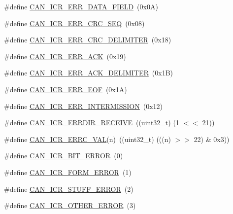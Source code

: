 \begin{DoxyCompactItemize}
\item 
\#define \hyperlink{group__CAN__17XX__40XX_ga6e4f045223b2f154cb449a95b5c19d2d}{C\-A\-N\-\_\-\-I\-C\-R\-\_\-\-E\-R\-R\-\_\-\-D\-A\-T\-A\-\_\-\-F\-I\-E\-L\-D}~(0x0\-A)
\item 
\#define \hyperlink{group__CAN__17XX__40XX_ga796e6b5aaf64f404e0d6960ce0dc2945}{C\-A\-N\-\_\-\-I\-C\-R\-\_\-\-E\-R\-R\-\_\-\-C\-R\-C\-\_\-\-S\-E\-Q}~(0x08)
\item 
\#define \hyperlink{group__CAN__17XX__40XX_gaa6defe8882ac6fb2e0048afa6bec7205}{C\-A\-N\-\_\-\-I\-C\-R\-\_\-\-E\-R\-R\-\_\-\-C\-R\-C\-\_\-\-D\-E\-L\-I\-M\-I\-T\-E\-R}~(0x18)
\item 
\#define \hyperlink{group__CAN__17XX__40XX_gadbec8cb293c961db6ba27da0fdd6a30c}{C\-A\-N\-\_\-\-I\-C\-R\-\_\-\-E\-R\-R\-\_\-\-A\-C\-K}~(0x19)
\item 
\#define \hyperlink{group__CAN__17XX__40XX_gaa073aa014b3274b624a476395bb3865a}{C\-A\-N\-\_\-\-I\-C\-R\-\_\-\-E\-R\-R\-\_\-\-A\-C\-K\-\_\-\-D\-E\-L\-I\-M\-I\-T\-E\-R}~(0x1\-B)
\item 
\#define \hyperlink{group__CAN__17XX__40XX_ga800e0bc49882ff1cfa4043087a8ff76c}{C\-A\-N\-\_\-\-I\-C\-R\-\_\-\-E\-R\-R\-\_\-\-E\-O\-F}~(0x1\-A)
\item 
\#define \hyperlink{group__CAN__17XX__40XX_gafd3bd849f9878685f2493810f74828ef}{C\-A\-N\-\_\-\-I\-C\-R\-\_\-\-E\-R\-R\-\_\-\-I\-N\-T\-E\-R\-M\-I\-S\-S\-I\-O\-N}~(0x12)
\item 
\#define \hyperlink{group__CAN__17XX__40XX_ga8c2502b4b9de05c032f1f9e30dbce585}{C\-A\-N\-\_\-\-I\-C\-R\-\_\-\-E\-R\-R\-D\-I\-R\-\_\-\-R\-E\-C\-E\-I\-V\-E}~((uint32\-\_\-t) (1 $<$$<$ 21))
\item 
\#define \hyperlink{group__CAN__17XX__40XX_gaf1e12de60b5088129364cf16e293e62d}{C\-A\-N\-\_\-\-I\-C\-R\-\_\-\-E\-R\-R\-C\-\_\-\-V\-A\-L}(n)~((uint32\-\_\-t) (((n) $>$$>$ 22) \& 0x3))
\item 
\#define \hyperlink{group__CAN__17XX__40XX_gae0d9f76da8551af305bc21299ae4f900}{C\-A\-N\-\_\-\-I\-C\-R\-\_\-\-B\-I\-T\-\_\-\-E\-R\-R\-O\-R}~(0)
\item 
\#define \hyperlink{group__CAN__17XX__40XX_ga30d289c9dfa864c2b80b9e558d152d45}{C\-A\-N\-\_\-\-I\-C\-R\-\_\-\-F\-O\-R\-M\-\_\-\-E\-R\-R\-O\-R}~(1)
\item 
\#define \hyperlink{group__CAN__17XX__40XX_gaf6250596af79d4af0a3f5e1ff7b46e74}{C\-A\-N\-\_\-\-I\-C\-R\-\_\-\-S\-T\-U\-F\-F\-\_\-\-E\-R\-R\-O\-R}~(2)
\item 
\#define \hyperlink{group__CAN__17XX__40XX_ga99676739f4c76530af531657c2cdf4c2}{C\-A\-N\-\_\-\-I\-C\-R\-\_\-\-O\-T\-H\-E\-R\-\_\-\-E\-R\-R\-O\-R}~(3)

\end{DoxyCompactItemize}
